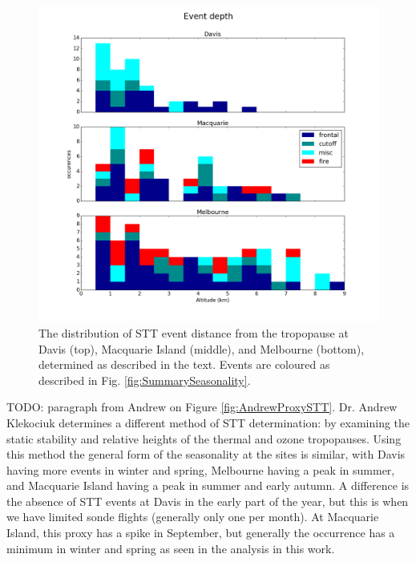 \documentclass{article}
\begin{document}
  \begin{figure}[!htbp]
    \begin{center}
    \includegraphics[width=0.99\columnwidth]{figures/summary_depth.png}
    \caption{The distribution of STT event distance from the tropopause at Davis (top), Macquarie Island (middle), and Melbourne (bottom), determined as described in the text.
    Events are coloured as described in Fig. \ref{fig:SummarySeasonality}.}
    \label{fig:SummaryTPDepths}
    \end{center}
  \end{figure}
  
  TODO: paragraph from Andrew on Figure \ref{fig:AndrewProxySTT}.
  Dr. Andrew Klekociuk determines a different method of STT determination: by examining the static stability and relative heights of the thermal and ozone tropopauses.
  Using this method the general form of the seasonality at the sites is similar, with Davis having more events in winter and spring, Melbourne having a peak in summer, and Macquarie Island having a peak in summer and early autumn.
  A difference is the absence of STT events at Davis in the early part of the year, but this is when we have limited sonde flights (generally only one per month).
  At Macquarie Island, this proxy has a spike in September, but generally the occurrence has a minimum in winter and spring as seen in the analysis in this work.
  
\end{document}
